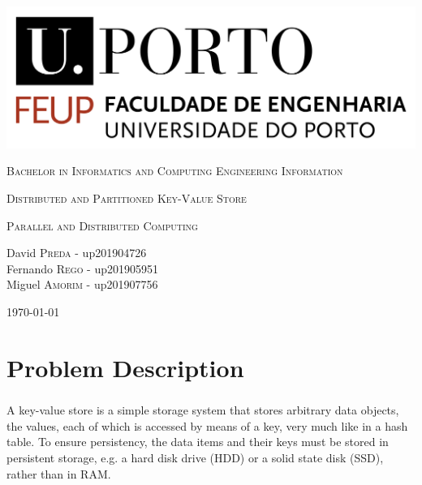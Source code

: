 \documentclass{report}
\begin{document}
	\begin{titlepage}
		\centering
		\includegraphics[scale=0.35]{logo_feup.png}\linebreak
		
		\vspace{1cm}
		
		{\scshape \large Bachelor in Informatics and Computing Engineering
		Information}
		
		\vspace {1cm}
		
		{\scshape\Huge Distributed and Partitioned Key-Value Store \par}
		
		\vfill
		
		{\scshape \large Parallel and Distributed Computing}
		
		\vfill
		
		\Large David \textsc{Preda} - up201904726 \\ Fernando
		\textsc{Rego} - up201905951 \\ Miguel \textsc{Amorim} - up201907756
		
		\vspace{1cm}
		
		\today
		
	\end{titlepage}

	\tableofcontents
	
	\chapter{Problem Description}
			\paragraph{} A key-value store is a simple storage system that stores arbitrary data objects, the values, each of which is accessed by means of a key, very much like in a hash table. To ensure persistency, the data items and their keys must be stored in persistent storage, e.g. a hard disk drive (HDD) or a solid state disk (SSD), rather than in RAM.
			
\end{document}
